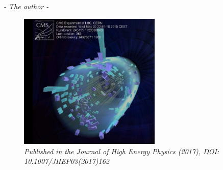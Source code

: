 \begin{flushright} \textit{- The author - } \end{flushright}
\begin{figure}[h!] 
    \centering
     \vspace*{10mm}
    \includegraphics[height=6.5cm]{figures/analysis/search1/misc/first_coll.png}
    \vspace*{10mm}
    \caption*{\footnotesize{\textit{Published in the Journal of High Energy Physics (2017), DOI: 10.1007/JHEP03(2017)162}}}
\end{figure}
\clearpage

\clearpage

